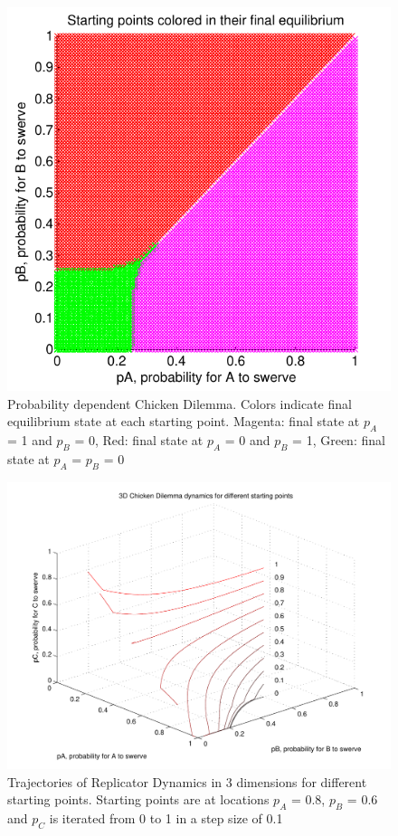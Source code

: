 \documentclass[11pt]{article}
\begin{document}
\begin{figure}[h]
\centering
\includegraphics[scale=1]{PhaseDiagramm2Db.pdf}
\caption{Probability dependent Chicken Dilemma. Colors indicate final equilibrium state at each starting point. Magenta: final state at $p_A$ = 1 and $p_B$ = 0, Red: final state at $p_A$ = 0 and $p_B$ = 1, Green: final state at $p_A$ = $p_B$ = 0}
\label{Phase2Db}
\end{figure}

\newpage

\begin{figure}[h]
\centering
\includegraphics[scale=0.7]{ReplicatorDynamics3Dimensions2.pdf}
\caption[Replicator Dynamics in 3 Dimensions]{Trajectories of Replicator Dynamics in 3 dimensions for different starting points. 
Starting points are at locations $p_A$ = 0.8, $p_B$ = 0.6 and $p_C$ is iterated from 0 to 1 in a step size of 0.1}
\label{Rep31}
\end{figure}
\end{document}
